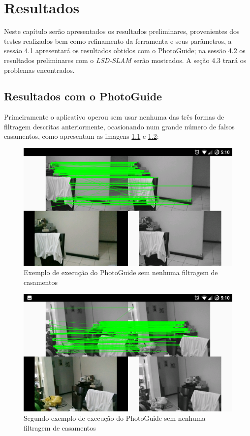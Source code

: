 \chapter{Resultados}

Neste capítulo serão apresentados os resultados preliminares, provenientes dos testes realizados bem como refinamento da ferramenta e seus parâmetros, a sessão 4.1 apresentará os resultados obtidos com o PhotoGuide; na sessão 4.2 os resultados preliminares com o \textit{LSD-SLAM} serão mostrados. A seção 4.3 trará os problemas encontrados.

\section{Resultados com o PhotoGuide}

Primeiramente o aplicativo operou sem usar nenhuma das três formas de filtragem descritas anteriormente, ocasionando num grande número de falsos casamentos, como apresentam as imagens \ref{fig4:1} e \ref{fig4:2}:

\begin{figure}[H]
	\centering
		\includegraphics[width= \textwidth]{Imagens/figura4-1.png}
	\caption{Exemplo de execução do PhotoGuide sem nenhuma filtragem de casamentos}
	\label{fig4:1}
\end{figure}

\begin{figure}[H]
	\centering
		\includegraphics[width= \textwidth]{Imagens/figura4-2.png}
	\caption{Segundo exemplo de execução do PhotoGuide sem nenhuma filtragem de casamentos}
	\label{fig4:2}
\end{figure}

